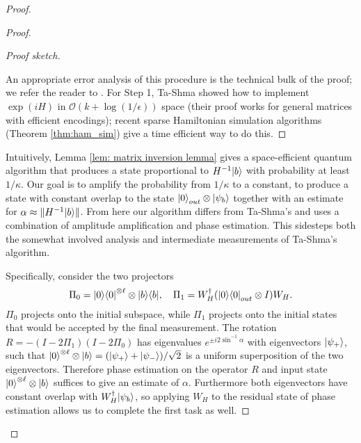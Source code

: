 \documentclass[a4paper,UKenglish]{lipics-v2016}
\newcommand\bigoh{\mathcal{O}}
\begin{document}
\begin{proof}
\begin{proof}
\begin{proof}[Proof sketch]
\begin{enumerate}
\end{enumerate}
An appropriate error analysis of this procedure is the technical bulk of the proof; we refer the reader to \cite{HHL}. For Step 1, Ta-Shma showed how to implement $\exp(iH)$ in $\bigoh (k+\log(1/\epsilon))$ space \cite[Theorem~4.1]{tashma} (their proof works for general matrices with efficient encodings); recent sparse Hamiltonian simulation algorithms (Theorem \ref{thm:ham_sim}) give a time efficient way to do this.
\end{proof}
Intuitively, Lemma \ref{lem: matrix inversion lemma} gives a space-efficient quantum algorithm that produces a state proportional to $H^{-1}{\left\vert{b}\right\rangle}$ with probability at least $1/\kappa$.  Our goal is to amplify the probability from $1/\kappa$ to a constant, to produce a state with constant overlap to the state ${\left\vert{0}\right\rangle}_{out} \otimes {\left\vert{\psi_b}\right\rangle}$ together with an estimate for $\alpha \approx \|H^{-1}{\left\vert{b}\right\rangle}\|$.  From here our algorithm differs from Ta-Shma's and uses a combination of amplitude amplification and phase estimation.  This sidesteps both the somewhat involved analysis and intermediate measurements of Ta-Shma's algorithm. 

Specifically, consider the two projectors
\begin{equation}
\Pi_0 = {\left\vert{0}\right\rangle}{\left\langle{0}\right\vert}^{\otimes \ell} \otimes {\left\vert{b}\right\rangle}{\left\langle{b}\right\vert}, \quad \Pi_1 = W_H^\dagger ({\left\vert{0}\right\rangle}{\left\langle{0}\right\vert}_{out} \otimes I) W_H.
\end{equation}
$\Pi_0$ projects onto the initial subspace, while $\Pi_1$ projects onto the initial states that would be accepted by the final measurement. The rotation $R=-(I-2\Pi_1)(I-2\Pi_0)$ has eigenvalues $e^{\pm i2\sin^{-1}\alpha}$ with eigenvectors ${\left\vert{\psi_+}\right\rangle}$, such that ${\left\vert{0}\right\rangle}^{\otimes \ell} \otimes {\left\vert{b}\right\rangle} = ({\left\vert{\psi_+}\right\rangle}+{\left\vert{\psi_-}\right\rangle})/\sqrt{2}$ is a uniform superposition of the two eigenvectors. Therefore phase estimation on the operator $R$ and input state ${\left\vert{0}\right\rangle}^{\otimes \ell} \otimes {\left\vert{b}\right\rangle}$ suffices to give an estimate of $\alpha$. Furthermore both eigenvectors have constant overlap with $W_H^{\dagger}{\left\vert{\psi_b}\right\rangle}$, so applying $W_H$ to the residual state of phase estimation allows us to complete the first task as well.


\end{proof}
\end{proof}
\end{document}
